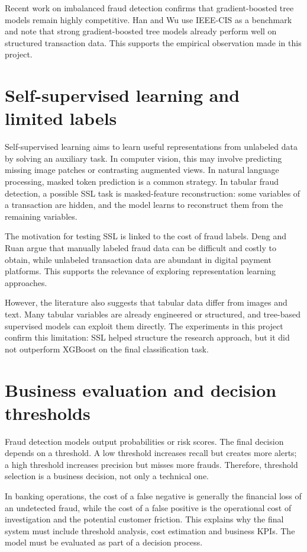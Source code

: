 ﻿\documentclass[12pt,a4paper,oneside]{report}
\begin{document}
Recent work on imbalanced fraud detection confirms that gradient-boosted tree models remain highly competitive. Han and Wu \cite{han2026cfa} use IEEE-CIS as a benchmark and note that strong gradient-boosted tree models already perform well on structured transaction data. This supports the empirical observation made in this project.

\section{Self-supervised learning and limited labels}

Self-supervised learning aims to learn useful representations from unlabeled data by solving an auxiliary task. In computer vision, this may involve predicting missing image patches or contrasting augmented views. In natural language processing, masked token prediction is a common strategy. In tabular fraud detection, a possible SSL task is masked-feature reconstruction: some variables of a transaction are hidden, and the model learns to reconstruct them from the remaining variables.

The motivation for testing SSL is linked to the cost of fraud labels. Deng and Ruan \cite{deng2019fraudjudger} argue that manually labeled fraud data can be difficult and costly to obtain, while unlabeled transaction data are abundant in digital payment platforms. This supports the relevance of exploring representation learning approaches.

However, the literature also suggests that tabular data differ from images and text. Many tabular variables are already engineered or structured, and tree-based supervised models can exploit them directly. The experiments in this project confirm this limitation: SSL helped structure the research approach, but it did not outperform XGBoost on the final classification task.

\section{Business evaluation and decision thresholds}

Fraud detection models output probabilities or risk scores. The final decision depends on a threshold. A low threshold increases recall but creates more alerts; a high threshold increases precision but misses more frauds. Therefore, threshold selection is a business decision, not only a technical one.

In banking operations, the cost of a false negative is generally the financial loss of an undetected fraud, while the cost of a false positive is the operational cost of investigation and the potential customer friction. This explains why the final system must include threshold analysis, cost estimation and business KPIs. The model must be evaluated as part of a decision process.
\end{document}
